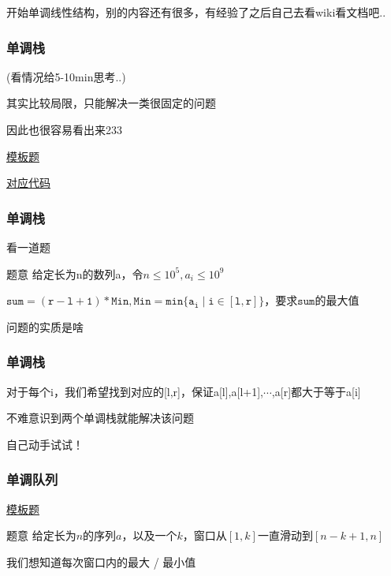 \documentclass{beamer}
\begin{document}
  \begin{frame}

    开始单调线性结构，别的内容还有很多，有经验了之后自己去看wiki看文档吧..
    
    \vspace*{1\baselineskip}

    \frametitle{单调栈}

    (看情况给5-10min思考..)

    其实比较局限，只能解决一类很固定的问题

    因此也很容易看出来233

    \vspace*{1\baselineskip}
    
    \href{https://www.luogu.com.cn/problem/P5788}{模板题}

    \vspace*{1\baselineskip}

    \href{http://syh521.cn/file/monotone-stack.cpp}{对应代码}
  \end{frame}

  \begin{frame}


    \frametitle{单调栈}
    看一道题

    \begin{block}{题意}
      给定长为n的数列a，令$n\leq 10^5,a_i\leq 10^9$
  
      $\mathtt{sum=(r-l+1)*Min,Min=min\{a_i\mid i\in [l,r]\}}$，要求$\mathtt{sum}$的最大值

    \end{block}
    \pause
    问题的实质是啥
  \end{frame}

  \begin{frame}
    \frametitle{单调栈}
    
    对于每个i，我们希望找到对应的[l,r]，保证a[l],a[l+1],$\cdots$,a[r]都大于等于a[i]

    \pause

    \vspace*{1\baselineskip}
    
    不难意识到两个单调栈就能解决该问题
    
    \pause
    
    \vspace*{1\baselineskip}

    自己动手试试！
  \end{frame}

  \begin{frame}
    \frametitle{单调队列}

    \href{https://www.luogu.com.cn/problem/P1886}{模板题}

    \begin{block}{题意}
      给定长为$n$的序列$a$，以及一个$k$，窗口从$[1,k]$一直滑动到$[n-k+1,n]$

      我们想知道每次窗口内的最大 / 最小值
    \end{block}
  \end{frame}
\end{document}
